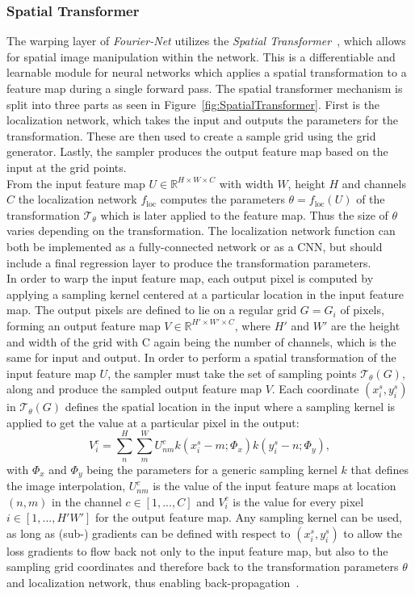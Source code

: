 \subsubsection{Spatial Transformer} \label{SubSubSec:SpatialTransformer}
The warping layer of \emph{Fourier-Net} utilizes the \emph{Spatial Transformer}~\cite{SpatialTransformer}, which allows for spatial image manipulation within the network. This is a differentiable and learnable module for neural networks which applies a spatial transformation to a feature map during a single forward pass. The spatial transformer mechanism is split into three parts as seen in Figure~\ref{fig:SpatialTransformer}. First is the localization network, which takes the input and outputs the parameters for the transformation. These are then used to create a sample grid using the grid generator. Lastly, the sampler produces the output feature map based on the input at the grid points.\\
From the input feature map $U \in \mathbb{R}^{H \times W \times C}$ with width $W$, height $H$ and channels $C$ the localization network $f_{\text{loc}}$ computes the parameters $\theta = f_{\text{loc}}(U)$ of the transformation $\mathcal{T}_\theta$ which is later applied to the feature map. Thus the size of $\theta$ varies depending on the transformation. 
The localization network function can both be implemented as a fully-connected network or as a CNN, but should include a final regression layer to produce the transformation parameters.\\
In order to warp the input feature map, each output pixel is computed by applying a sampling kernel centered at a particular location in the input feature map. The output pixels are defined to lie on a regular grid $G = {G_i}$ of pixels, forming an output feature map $V \in \mathbb{R}^{H' \times W' \times C}$, where $H'$ and $W'$ are the height and width of the grid with C again being the number of channels, which is the same for input and output. In order to perform a spatial transformation of the input feature map $U$, the sampler must take the set of sampling points $\mathcal{T}_\theta(G)$, along and produce the sampled output feature map $V$. Each coordinate $(x_i^s, y_i^s)$ in $\mathcal{T}_\theta(G)$ defines the spatial location in the input where a sampling kernel is applied to get the value at a particular pixel in the output:
\begin{equation}
	V_i^c = \sum^{H}_{n} \sum^{W}_{m} U_{nm}^c k(x_i^s - m; \Phi_x) k(y_i^s - n; \Phi_y),
\end{equation}
with $\Phi_x$ and $\Phi_y$ being the parameters for a generic sampling  kernel $k$ that defines the image interpolation, $U_{nm}^c$ is the value of the input feature maps at location $(n,m)$ in the channel $c \in [1, ..., C]$ and $V_i^c$ is the value for every pixel $i \in [1, ..., H'W']$ for the output feature map. Any sampling kernel can be used, as long as (sub-) gradients can be defined with respect to $(x_i^s, y_i^s)$ to allow the loss gradients to flow back not only to the input feature map, but also to the sampling grid coordinates and therefore back to the transformation parameters $\theta$ and localization network, thus enabling back-propagation~\cite{SpatialTransformer}.

